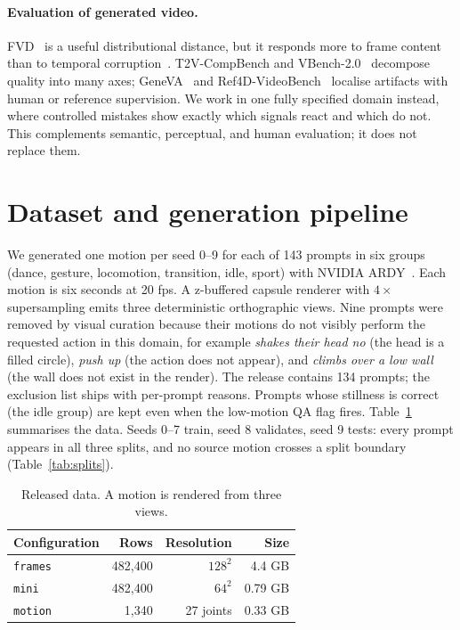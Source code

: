 \documentclass[11pt]{article}
\begin{document}
\paragraph{Evaluation of generated video.} FVD~\cite{unterthiner2018fvd} is a useful distributional distance,
but it responds more to frame content than to temporal corruption~\cite{ge2024fvdbias}. T2V-CompBench and
VBench-2.0~\cite{sun2025compbench,zheng2025vbench2} decompose quality into many axes; GeneVA~\cite{kang2026geneva}
and Ref4D-VideoBench~\cite{wei2026ref4d} localise artifacts with human or reference supervision. We work in one
fully specified domain instead, where controlled mistakes show exactly which signals react and which do not.
This complements semantic, perceptual, and human evaluation; it does not replace them.

\section{Dataset and generation pipeline}
We generated one motion per seed 0--9 for each of 143 prompts in six groups (dance, gesture, locomotion,
transition, idle, sport) with NVIDIA ARDY~\cite{zhao2026ardy}. Each motion is six seconds at 20 fps. A
z-buffered capsule renderer with $4\times$ supersampling emits three deterministic orthographic views. Nine
prompts were removed by visual curation because their motions do not visibly perform the requested action in
this domain, for example \emph{shakes their head no} (the head is a filled circle), \emph{push up} (the action
does not appear), and \emph{climbs over a low wall} (the wall does not exist in the render). The release
contains 134 prompts; the exclusion list ships with per-prompt reasons. Prompts whose stillness is correct (the
idle group) are kept even when the low-motion QA flag fires. Table~\ref{tab:data} summarises the data. Seeds
0--7 train, seed 8 validates, seed 9 tests: every prompt appears in all three splits, and no source motion
crosses a split boundary (Table~\ref{tab:splits}).

\begin{table}[t]\centering\caption{Released data. A motion is rendered from three views.}\label{tab:data}\small
\begin{tabular}{@{}lrrr@{}}\toprule Configuration & Rows & Resolution & Size \\\midrule
\texttt{frames} & 482,400 & $128^2$ & 4.4 GB \\
\texttt{mini} & 482,400 & $64^2$ & 0.79 GB \\
\texttt{motion} & 1,340 & 27 joints & 0.33 GB \\\bottomrule\end{tabular}\end{table}
\end{document}
